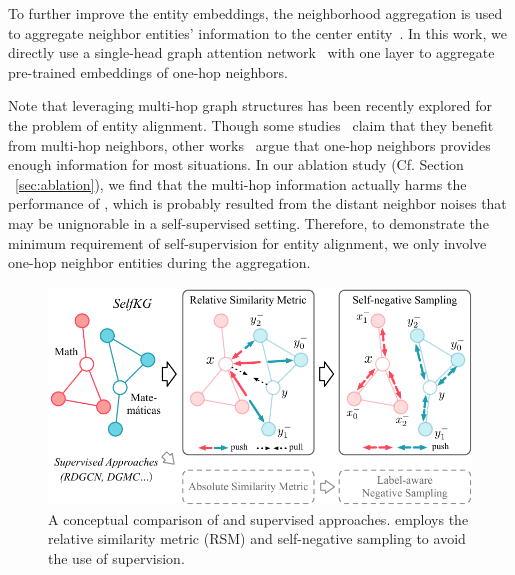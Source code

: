 To further improve the entity embeddings, 
the neighborhood aggregation is used to aggregate neighbor entities' information to the center entity~\cite{GCN-Align,xu2019cross-lingual}. 
In this work, we directly use a single-head graph attention network~\cite{velivckovic2017graph} with one layer to aggregate pre-trained embeddings of one-hop neighbors.

Note that leveraging multi-hop graph structures has been recently explored for the problem of entity alignment. 
Though some studies~\cite{fey2020deep,wu2019relation,GCN-Align} claim that they benefit from multi-hop neighbors, other works~\cite{xu2019cross-lingual,zhang2018mego2vec} argue that one-hop neighbors provides enough information for most situations. 
In our ablation study (Cf. Section ~\ref{sec:ablation}), we find that the multi-hop information actually harms the performance of \solution, which is probably resulted from the distant neighbor noises that may be unignorable in a self-supervised setting. 
Therefore, to demonstrate the minimum requirement of self-supervision for entity alignment, we only involve one-hop neighbor entities during the aggregation. %




\begin{figure}[t]
\centering
\includegraphics[width=\linewidth]{img/selfkg-new.pdf}
\caption{A conceptual comparison of \solution and supervised approaches. \textmd{\solution employs the relative similarity metric (RSM) and self-negative sampling to avoid the use of supervision.}
\label{fig:motivations}
}
% 
\vspace{-3mm}
\end{figure}



